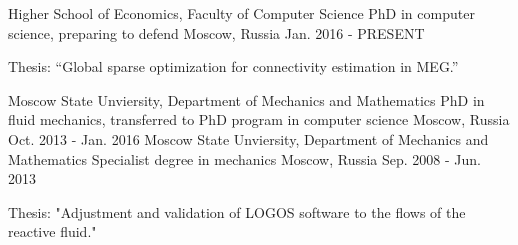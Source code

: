 \begin{cventries}
  \cventry
    {Higher School of Economics, Faculty of Computer Science}
    {PhD in computer science, preparing to defend}
    {Moscow, Russia}
    {Jan. 2016 - PRESENT}
    {
      \begin{cvitems}
        \item {Thesis: ``Global sparse optimization for connectivity estimation in MEG.''}
      \end{cvitems}
    }
  \cventry
    {Moscow State Unviersity, Department of Mechanics and Mathematics}
    {PhD in fluid mechanics, transferred to PhD program in computer science}
    {Moscow, Russia}
    {Oct. 2013 - Jan. 2016}
    {
    }
  \cventry
    {Moscow State Unviersity, Department of Mechanics and Mathematics}
    {Specialist degree in mechanics}
    {Moscow, Russia}
    {Sep. 2008 - Jun. 2013}
    {
      \begin{cvitems}
        \item{Thesis: "Adjustment and validation of LOGOS software to the flows of the reactive fluid."}
      \end{cvitems}
    }
\end{cventries}
